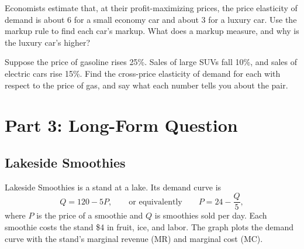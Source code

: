 \ifsolutions\else\clearpage\fi
{} Economists estimate that, at their profit-maximizing prices, the price elasticity of demand is about 6 for a small economy car and about 3 for a luxury car. Use the markup rule to find each car's markup. What does a markup measure, and why is the luxury car's higher?
\ifsolutions\else\vfill\fi
{}

 Suppose the price of gasoline rises 25\%. Sales of large SUVs fall 10\%, and sales of electric cars rise 15\%. Find the cross-price elasticity of demand for each with respect to the price of gas, and say what each number tells you about the pair.
\ifsolutions\else\vfill\fi
{}

\ifsolutions\clearpage\else{}\fi
\section{Part 3: Long-Form Question }

\subsection{Lakeside Smoothies}

Lakeside Smoothies is a stand at a lake. Its demand curve is
\[ Q = 120 - 5P, \qquad\text{or equivalently}\qquad P = 24 - \frac{Q}{5}, \]
where $P$ is the price of a smoothie and $Q$ is smoothies sold per day. Each smoothie costs the stand \$4 in fruit, ice, and labor. The graph plots the demand curve with the stand's marginal revenue (MR) and marginal cost (MC).

